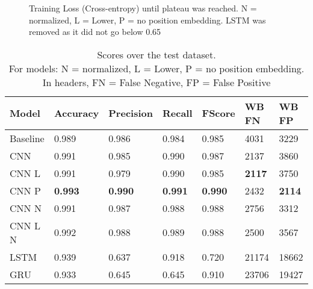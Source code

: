 \documentclass{jdmdh}
\begin{document}
\begin{figure}[!ht]
  \begin{center}
    \caption{Training Loss (Cross-entropy) until plateau was reached. N = normalized, L = Lower, P = no position embedding. LSTM was removed as it did not go below 0.65}
  \label{fig:loss}
  \end{center}
\end{figure}

\begin{table}[!ht]
\centering
\begin{tabular}{lllllll}
\hline
Model    & Accuracy & Precision & Recall & FScore & WB FN & WB FP \\ \hline
Baseline & 0.989    & 0.986     & 0.984  & 0.985 & 4031 & 3229 \\
CNN      & 0.991    & 0.985     & 0.990  & 0.987 & 2137 & 3860 \\
CNN L    & 0.991    & 0.979     & 0.990  & 0.985 & \textbf{2117} & 3750 \\
CNN P    & \textbf{0.993}    & \textbf{0.990}& \textbf{0.991}  & \textbf{0.990} & 2432 & \textbf{2114} \\
CNN N    & 0.991    & 0.987     & 0.988  & 0.988 & 2756 & 3312 \\
CNN L N  & 0.992    & 0.988     & 0.989  & 0.988 & 2500 & 3567 \\
LSTM     & 0.939    & 0.637     & 0.918  & 0.720 & 21174 & 18662 \\
GRU     & 0.933    & 0.645     & 0.645  & 0.910 & 23706 & 19427 \\ \hline
\end{tabular}
\caption{Scores over the test dataset. \\\hspace{\textwidth}For models: N = normalized, L = Lower, P = no position embedding. \\\hspace{\textwidth}In headers, FN = False Negative, FP = False Positive}
\label{tab:scores}
\end{table}
\end{document}
